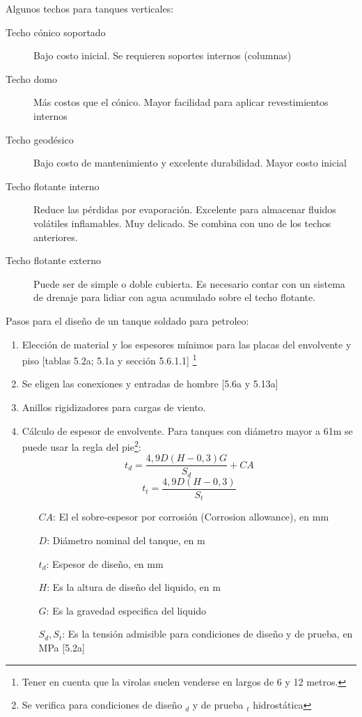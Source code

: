 \documentclass[twocolumn]{article}
\begin{document}
Algunos techos para tanques verticales:
\begin{description}
	\item[Techo cónico soportado]  Bajo costo inicial. Se requieren soportes internos (columnas)
	\item[Techo domo] Más costos que el cónico. Mayor facilidad para aplicar revestimientos internos
	\item[Techo geodésico] Bajo costo de mantenimiento y excelente durabilidad. Mayor costo inicial
	\item[Techo flotante interno] Reduce las pérdidas por evaporación. Excelente para almacenar fluidos volátiles inflamables. Muy delicado. Se combina con uno de los techos anteriores.
	\item[Techo flotante externo] Puede ser de simple o doble cubierta. Es necesario contar con un sistema de drenaje para lidiar con agua acumulado sobre el techo flotante.
\end{description}

Pasos para el diseño de un tanque soldado para petroleo:
\begin{enumerate}
	\item Elección de material y los espesores mínimos para las placas del envolvente y piso [tablas 5.2a; 5.1a y sección 5.6.1.1] \footnote{Tener en cuenta que la virolas suelen venderse en largos de 6 y 12 metros.}
	\item Se eligen las conexiones y entradas de hombre [5.6a y 5.13a]
	\item Anillos rigidizadores para cargas de viento. 
	\item Cálculo de espesor de envolvente. Para tanques con diámetro mayor a 61m se puede usar la regla del pie\footnote{Se verifica para condiciones de diseño $_d$ y de prueba $_t$  hidrostática}:
	\[
	t_d = \frac{4,9D(H-0,3)G}{S_d} + CA
	\]
	\[
	t_t = \frac{4,9D(H-0,3)}{S_t}
	\]
	\begin{itemize}
		\item[$CA$:] El el sobre-espesor por corrosión (Corrosion allowance), en mm
		\item[$D$:] Diámetro nominal del tanque, en m
		\item[$t_d$:]  Espesor de diseño, en mm
		\item[$H$:] Es la altura de diseño del liquido, en m 
		\item[$G$:] Es la gravedad especifica del liquido 
		\item[$S_d,S_t$:] Es la tensión admisible para condiciones de diseño y de prueba, en MPa  [5.2a]
	\end{itemize}
\end{enumerate}
\end{document}
